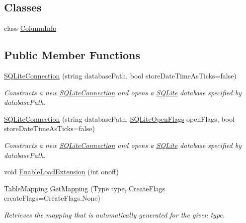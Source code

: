\subsection*{Classes}
\begin{DoxyCompactItemize}
\item 
class \hyperlink{class_s_q_lite_1_1_s_q_lite_connection_1_1_column_info}{Column\+Info}
\end{DoxyCompactItemize}
\subsection*{Public Member Functions}
\begin{DoxyCompactItemize}
\item 
\hyperlink{class_s_q_lite_1_1_s_q_lite_connection_a21204da14d0e2a44039f3395bb4ff12d}{S\+Q\+Lite\+Connection} (string database\+Path, bool store\+Date\+Time\+As\+Ticks=false)
\begin{DoxyCompactList}\small\item\em Constructs a new \hyperlink{class_s_q_lite_1_1_s_q_lite_connection}{S\+Q\+Lite\+Connection} and opens a \hyperlink{namespace_s_q_lite}{S\+Q\+Lite} database specified by database\+Path. \end{DoxyCompactList}\item 
\hyperlink{class_s_q_lite_1_1_s_q_lite_connection_a5d0deb6299d3f479e53cf81899023457}{S\+Q\+Lite\+Connection} (string database\+Path, \hyperlink{namespace_s_q_lite_a9d72cc097c53dbc96a6f0eec530cc439}{S\+Q\+Lite\+Open\+Flags} open\+Flags, bool store\+Date\+Time\+As\+Ticks=false)
\begin{DoxyCompactList}\small\item\em Constructs a new \hyperlink{class_s_q_lite_1_1_s_q_lite_connection}{S\+Q\+Lite\+Connection} and opens a \hyperlink{namespace_s_q_lite}{S\+Q\+Lite} database specified by database\+Path. \end{DoxyCompactList}\item 
void \hyperlink{class_s_q_lite_1_1_s_q_lite_connection_ae9cb05b6c85322d73dd70688182edb01}{Enable\+Load\+Extension} (int onoff)
\item 
\hyperlink{class_s_q_lite_1_1_table_mapping}{Table\+Mapping} \hyperlink{class_s_q_lite_1_1_s_q_lite_connection_a0c0db552a653e0797cf772706148eb41}{Get\+Mapping} (Type type, \hyperlink{namespace_s_q_lite_a5ada328810363319c85c3e0c28c67479}{Create\+Flags} create\+Flags=Create\+Flags.\+None)
\begin{DoxyCompactList}\small\item\em Retrieves the mapping that is automatically generated for the given type. \end{DoxyCompactList}\item 

\end{DoxyCompactItemize}
